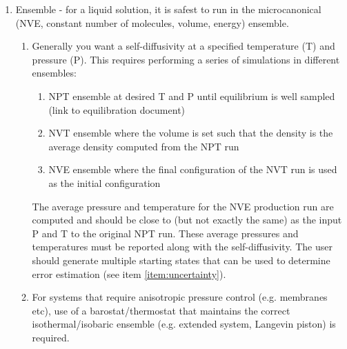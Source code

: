 \documentclass[9pt]{livecoms}
\begin{document}
\begin{enumerate}
	\item Ensemble - for a liquid solution, it is safest to run in the microcanonical (NVE, constant number of molecules, volume, energy) ensemble. %
	\begin{enumerate}
		\item Generally you want a self-diffusivity at a specified temperature (T) and pressure (P). This requires performing a series of simulations in different ensembles:
		\begin{enumerate}
			\item NPT ensemble at desired T and P until equilibrium is well sampled (link to equilibration document)
			\item NVT ensemble where the volume is set such that the density is the average density computed from the NPT run
			\item NVE ensemble where the final configuration of the NVT run is used as the initial configuration
		\end{enumerate}
		The average pressure and temperature for the NVE production run are computed and should be close to (but not exactly the same) as the input P and T to the original NPT run. These average pressures and temperatures must be reported along with the self-diffusivity. The user should generate multiple starting states that can be used to determine error estimation (see item \ref{item:uncertainty}).
		\item For systems that require anisotropic pressure control (e.g. membranes etc), use of a barostat/thermostat that maintains the correct isothermal/isobaric ensemble (e.g. extended system, Langevin piston) is required.
	\end{enumerate}

\end{enumerate}
\end{document}
